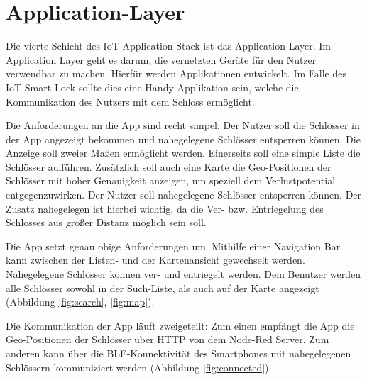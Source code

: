 
\section{Application-Layer}
Die vierte Schicht des \ac{IoT}-Application Stack ist das Application Layer. Im Application Layer geht es darum, die vernetzten Geräte für den Nutzer verwendbar zu machen. Hierfür werden Applikationen entwickelt. Im Falle des \ac{IoT} Smart-Lock sollte dies eine Handy-Applikation sein, welche die Kommunikation des Nutzers mit dem Schloss ermöglicht.

Die Anforderungen an die App sind recht simpel: Der Nutzer soll die Schlösser in der App angezeigt bekommen und nahegelegene Schlösser entsperren können. Die Anzeige soll zweier Maßen ermöglicht werden. Einerseits soll eine simple Liste die Schlösser aufführen. Zusätzlich soll auch eine Karte die Geo-Positionen der Schlösser mit hoher Genauigkeit anzeigen, um speziell dem Verlustpotential entgegenzuwirken. Der Nutzer soll nahegelegene Schlösser entsperren können. Der Zusatz nahegelegen ist hierbei wichtig, da die Ver- bzw. Entriegelung des Schlosses aus großer Distanz möglich sein soll.

Die App setzt genau obige Anforderungen um. Mithilfe einer Navigation Bar kann zwischen der Listen- und der Kartenansicht gewechselt werden. Nahegelegene Schlösser können ver- und entriegelt werden. Dem Benutzer werden alle Schlösser sowohl in der Such-Liste, als auch auf der Karte angezeigt (Abbildung \ref{fig:search}, \ref{fig:map}).

Die Kommunikation der App läuft zweigeteilt: Zum einen empfängt die App die Geo-Positionen der Schlösser über \ac{HTTP} von dem Node-Red Server. Zum anderen kann über die \ac{BLE}-Konnektivität des Smartphones mit nahegelegenen Schlössern kommuniziert werden (Abbildung \ref{fig:connected}).

